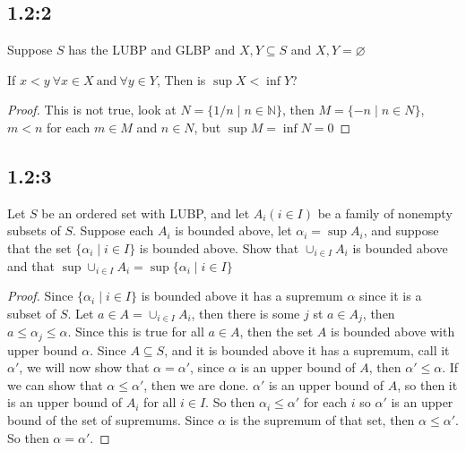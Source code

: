 \documentclass[11pt]{article}
\newcommand{\N}{\mathbb{N}}
\newenvironment{bp}{\color{blue}\begin{proof}}{\end{proof}}
\renewcommand{\subset}{\subseteq}
\let\null\varnothing
\begin{document}
\subsection*{1.2:2}
Suppose $S$ has the LUBP and GLBP and $X, Y \subset S$ and $X, Y = \null$

If $x < y\ \forall x\in X\ \text{and}\ \forall y\in Y$, Then is $\sup X < \inf Y$?
\begin{bp}
  This is not true, look at $N = \{1/n \mid n\in \N\}$, then $M = \{- n\mid n \in N\}$, $m < n$ for each $m\in M$ and $n\in N$, but $\sup M = \inf N = 0$
\end{bp}

\subsection*{1.2:3}
Let $S$ be an ordered set with LUBP, and let $A_i(i\in I)$ be a family of nonempty subsets of $S$. Suppose each $A_i$ is bounded above, let $\alpha_i = \sup A_i$, and suppose that the set $\{\alpha_i \mid i\in I\}$ is bounded above. Show that $\cup_{i\in I}A_i$ is bounded above and that $\sup \cup_{i\in I}A_i = \sup\{\alpha_i \mid i\in I\}$
\begin{bp}
Since $\{\alpha_i \mid i\in I\}$ is bounded above it has a supremum $\alpha$ since it is a subset of $S$. Let $a\in A = \cup_{i\in I}A_i$, then there is some $j$ st $a\in A_j$, then $a \leq \alpha_j\leq \alpha$. Since this is true for all $a\in A$, then the set $A$ is bounded above with upper bound $\alpha$. Since $A\subset S$, and it is bounded above it has a supremum, call it $\alpha'$, we will now show that $\alpha = \alpha'$, since $\alpha$ is an upper bound of $A$, then $\alpha' \leq \alpha$. If we can show that $\alpha\leq\alpha'$, then we are done. $\alpha'$ is an upper bound of $A$, so then it is an upper bound of $A_i$ for all $i\in I$. So then $\alpha_i \leq\alpha'$ for each $i$ so $\alpha'$ is an upper bound of the set of supremums. Since $\alpha$ is the supremum of that set, then $\alpha\leq\alpha'$. So then $\alpha=\alpha'$.
\end{bp}
\end{document}
